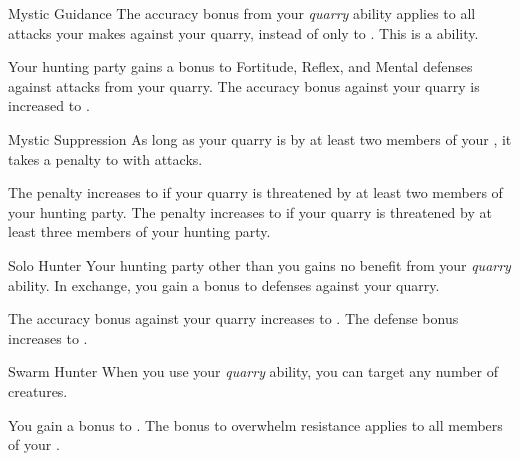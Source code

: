 {            \begin{freeability}{Mystic Guidance}
                The accuracy bonus from your \textit{quarry} ability applies to all attacks your  makes against your quarry, instead of only to .
                This is a  ability.

                \rankline
                 Your hunting party gains a  bonus to Fortitude, Reflex, and Mental defenses against attacks from your quarry.
                 The accuracy bonus against your quarry is increased to .
            \end{freeability}

            \begin{freeability}{Mystic Suppression}
                As long as your quarry is  by at least two members of your , it takes a  penalty to  with  attacks.

                \rankline
                 The penalty increases to  if your quarry is threatened by at least two members of your hunting party.
                 The penalty increases to  if your quarry is threatened by at least three members of your hunting party.
            \end{freeability}

            \begin{freeability}{Solo Hunter}
                Your hunting party other than you gains no benefit from your \textit{quarry} ability.
                In exchange, you gain a  bonus to defenses against your quarry.

                \rankline
                 The accuracy bonus against your quarry increases to .
                 The defense bonus increases to .
            \end{freeability}

            \begin{freeability}{Swarm Hunter}
                When you use your \textit{quarry} ability, you can target any number of creatures.

                \rankline
                 You gain a  bonus to .
                 The bonus to overwhelm resistance applies to all members of your .
            \end{freeability}

}
